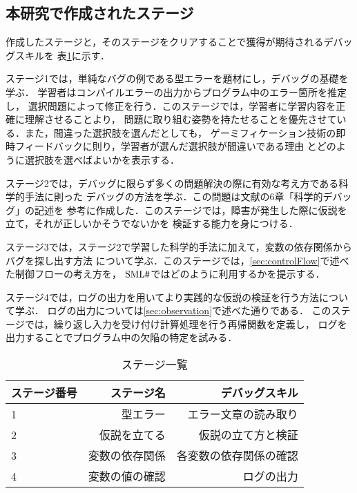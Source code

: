 \documentclass{jreport}
\newcommand\SMLSharp{$\mbox{SML\fontfamily{ptm}\selectfont\#}$}
\begin{document}
\subsection{本研究で作成されたステージ}
作成したステージと，そのステージをクリアすることで獲得が期待されるデバッグスキルを
表\ref{tbl:stage}に示す．

ステージ1では，単純なバグの例である型エラーを題材にし，デバッグの基礎を学ぶ．
学習者はコンパイルエラーの出力からプログラム中のエラー箇所を推定し，
選択問題によって修正を行う．このステージでは，学習者に学習内容を正確に理解させることより，
問題に取り組む姿勢を持たせることを優先させている．また，間違った選択肢を選んだとしても，
ゲーミフィケーション技術の即時フィードバックに則り，学習者が選んだ選択肢が間違いである理由
とどのように選択肢を選べばよいかを表示する．

ステージ2では，デバッグに限らず多くの問題解決の際に有効な考え方である科学的手法に則った
デバッグの方法を学ぶ．この問題は文献\cite{Andreas:Debugging}の6章「科学的デバッグ」の記述を
参考に作成した．このステージでは，障害が発生した際に仮説を立て，それが正しいかそうでないかを
検証する能力を身につける．

ステージ3では，ステージ2で学習した科学的手法に加えて，変数の依存関係からバグを探し出す方法
について学ぶ．このステージでは，\ref{sec:controlFlow}で述べた制御フローの考え方を，
\SMLSharp ではどのように利用するかを提示する．

ステージ4では，ログの出力を用いてより実践的な仮説の検証を行う方法について学ぶ．
ログの出力については\ref{sec:observation}で述べた通りである．
このステージでは，繰り返し入力を受け付け計算処理を行う再帰関数を定義し，
ログを出力することでプログラム中の欠陥の特定を試みる．

\begin{table}[htp]
  \begin{center}
    \caption{ステージ一覧}
    \label{tbl:stage}
    \begin{tabular}{lrr} \toprule
      ステージ番号 & ステージ名 & デバッグスキル \\ \midrule
      1 & 型エラー & エラー文章の読み取り \\
      2 & 仮説を立てる & 仮説の立て方と検証  \\
      3 & 変数の依存関係 & 各変数の依存関係の確認 \\
      4 & 変数の値の確認 & ログの出力 \\ \bottomrule
    \end{tabular}
  \end{center}
\end{table}
\end{document}
